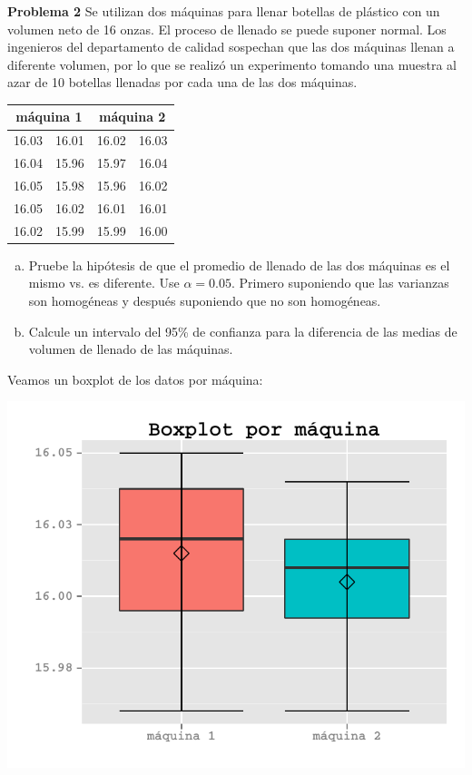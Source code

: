 \documentclass[a4paper]{scrartcl}\usepackage[]{graphicx}\usepackage[]{color}
\makeatletter
\def\maxwidth{ %
  \ifdim\Gin@nat@width>\linewidth
    \linewidth
  \else
    \Gin@nat@width
  \fi
}
\newenvironment{knitrout}{}{} %
\makeatother
\begin{document}
\newpage
\textbf{Problema 2}
Se utilizan dos máquinas para llenar botellas de plástico con un volumen neto de 16 onzas. El proceso de llenado se puede suponer normal. Los ingenieros del departamento de calidad sospechan que las dos máquinas llenan a diferente volumen, por lo que se realizó un experimento tomando una muestra al azar de 10 botellas llenadas por cada una de las dos máquinas.

\begin{table}[h!]
\centering
\begin{tabular}[t]{|c|c|c|c|}
\hline
\multicolumn{2}{|c|}{\textbf{máquina 1}}&\multicolumn{2}{|c|}{\textbf{máquina 2}}\\
\hline
16.03&16.01&16.02&16.03\\
16.04&15.96&15.97&16.04\\
16.05&15.98&15.96&16.02\\
16.05&16.02&16.01&16.01\\
16.02&15.99&15.99&16.00\\
\hline
\end{tabular}
\end{table}

\begin{enumerate}[a)]
  \item Pruebe la hipótesis de que el promedio de llenado de las dos máquinas es el mismo vs. es diferente.  Use $\alpha=0.05$. Primero suponiendo que las varianzas son homogéneas y después suponiendo que no son homogéneas.
  \item Calcule un intervalo del 95\% de confianza para la diferencia de las  medias de volumen de llenado de las máquinas.
\end{enumerate}

\noindent Veamos un boxplot de los datos por máquina:

\begin{knitrout}
\color{fgcolor}

{\centering \includegraphics[width=\maxwidth]{figure/unnamed-chunk-4} 

}



\end{knitrout}
\end{document}

